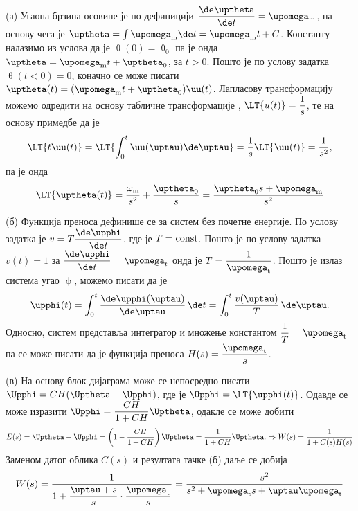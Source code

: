 \RESENJE 
(а) Угаона брзина осовине је по дефиницији $\dfrac{\de \uptheta}{\de t} = \upomega_{\rm m}$, на основу чега је 
$\uptheta = \int \upomega_{\rm m} \de t = \upomega_{\rm m} t + C$. Константу налазимо из услова да је 
$\uptheta(0) = \uptheta_0$ па је онда $\uptheta = \upomega_{\rm m} t + \uptheta_0$, за $t > 0$. Пошто је по услову
задатка $\uptheta(t < 0) = 0$, коначно се може писати 
$\uptheta(t) = (\upomega_{\rm m} t + \uptheta_0) \uu(t)$. Лапласову трансформацију можемо одредити на основу табличне 
трансформације , $\LT{u(t)} = \dfrac{1}{s}$, те на основу примедбе да је 
\begin{eqnarray}
    \LT{t \uu(t)} = \LT{ \int_0^{t} \uu(\uptau) \de \uptau} = \dfrac{1}{s} \LT{\uu(t)} = \dfrac{1}{s^2},
\end{eqnarray}
па је онда 
\begin{eqnarray}
    \LT{\uptheta(t)} = \dfrac{\omega_{\rm m}}{s^2} + \dfrac{\uptheta_0}{s} = \dfrac{\uptheta_0 s + \upomega_{\rm m}}{s^2}
\end{eqnarray}

(б) Функција преноса дефинише се за систем без почетне енергије. По услову задатка је  $v = T \dfrac{\de \upphi}{\de t}$, где је  
$T = {\rm const}$. Пошто је по услову задатка $v(t) = 1$ за $\dfrac{\de \upphi}{\de t} = \upomega_t$ онда је 
$T = \dfrac{1}{\upomega_{\rm t}}$. Пошто је излаз система угао $\upphi$, можемо писати да је 
\begin{equation}
    \upphi(t) = \int_{0}^{t} \dfrac{\de \upphi(\uptau)}{\de \uptau} \, \de t 
              = \int_{0}^{t} \dfrac{v(\uptau)}{T} \, \de \uptau.
\end{equation}
Односно, систем представља интегратор и множење константом $\dfrac{1}{T} = \upomega_{\rm t}$ 
па се може писати да је функција преноса $H(s) = \dfrac{\upomega_{\rm t}}{s}$.

(в) На основу блок дијаграма може се непосредно писати 
$\Upphi = CH( \Uptheta - \Upphi )$, где је $\Upphi = \LT{\upphi(t)}$. Одавде се може изразити 
$\Upphi = \dfrac{CH}{1 + CH} \Uptheta$, одакле се може добити 
\begin{eqnarray}
    E(s) = \Uptheta - \Upphi = 
        \left(
           1 - \dfrac{CH}{1 + CH} 
        \right) \Uptheta
         = \dfrac{1}{1 + CH} \Uptheta. \Rightarrow W(s) = \dfrac{1}{1 + C(s)H(s)}
\end{eqnarray}
Заменом датог облика $C(s)$ и резултата тачке (б) даље се добија 
\begin{eqnarray}
    W(s) = \dfrac{1}{1 + 
    \dfrac{\uptau + s}{s} \cdot \dfrac{\upomega_{\rm t}}{s}
    }
    = \dfrac{s^2}{s^2 + \upomega_{\rm t}s + \uptau \upomega_{\rm t} }
\end{eqnarray}

